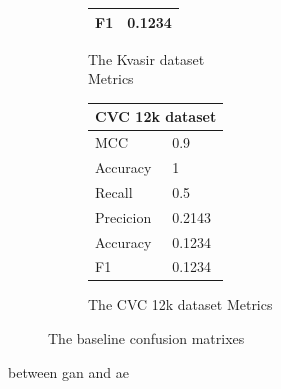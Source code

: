 \begin{figure}[h]
\begin{subfigure}[b]{0.49\textwidth}
\begin{tabular}{ll}
        F1                                     & 0.1234\\
        \bottomrule
\end{tabular}
\caption{The Kvasir dataset\\ Metrics}
\label{tab:kvasir_metrics_base}
\end{subfigure}%
\begin{subfigure}[b]{0.25\textwidth}
        \begin{tabular}{ll}
        \toprule
        \multicolumn{2}{c}{CVC 12k dataset}        \\
        \midrule
        MCC & 0.9    \\
        Accuracy                         & 1      \\
        Recall                              & 0.5    \\
        Precicion                        & 0.2143 \\
        Accuracy                        & 0.1234 \\
        F1                                     & 0.1234\\
        \bottomrule
        \end{tabular}
\caption{The CVC 12k dataset Metrics}
\label{tab:cvc12k_metrics_base}
\end{subfigure}
\caption{The baseline confusion matrixes}
\label{fig:BaselineCM}
\end{figure}

between gan and ae

